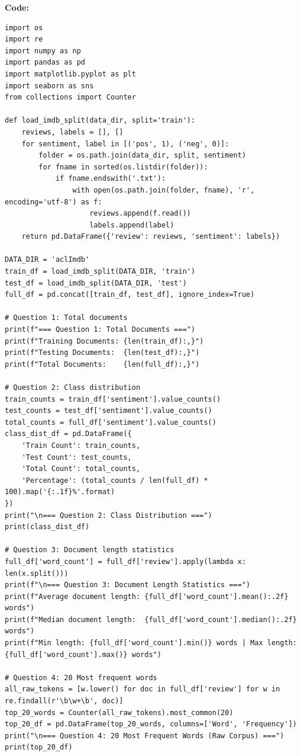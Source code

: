 \documentclass[12pt]{article}
\begin{document}
\textbf{Code:}

\begin{lstlisting}[style=code]
import os
import re
import numpy as np
import pandas as pd
import matplotlib.pyplot as plt
import seaborn as sns
from collections import Counter

def load_imdb_split(data_dir, split='train'):
    reviews, labels = [], []
    for sentiment, label in [('pos', 1), ('neg', 0)]:
        folder = os.path.join(data_dir, split, sentiment)
        for fname in sorted(os.listdir(folder)):
            if fname.endswith('.txt'):
                with open(os.path.join(folder, fname), 'r', encoding='utf-8') as f:
                    reviews.append(f.read())
                    labels.append(label)
    return pd.DataFrame({'review': reviews, 'sentiment': labels})

DATA_DIR = 'aclImdb'
train_df = load_imdb_split(DATA_DIR, 'train')
test_df = load_imdb_split(DATA_DIR, 'test')
full_df = pd.concat([train_df, test_df], ignore_index=True)

# Question 1: Total documents
print(f"=== Question 1: Total Documents ===")
print(f"Training Documents: {len(train_df):,}")
print(f"Testing Documents:  {len(test_df):,}")
print(f"Total Documents:    {len(full_df):,}")

# Question 2: Class distribution
train_counts = train_df['sentiment'].value_counts()
test_counts = test_df['sentiment'].value_counts()
total_counts = full_df['sentiment'].value_counts()
class_dist_df = pd.DataFrame({
    'Train Count': train_counts,
    'Test Count': test_counts,
    'Total Count': total_counts,
    'Percentage': (total_counts / len(full_df) * 100).map('{:.1f}%'.format)
})
print("\n=== Question 2: Class Distribution ===")
print(class_dist_df)

# Question 3: Document length statistics
full_df['word_count'] = full_df['review'].apply(lambda x: len(x.split()))
print(f"\n=== Question 3: Document Length Statistics ===")
print(f"Average document length: {full_df['word_count'].mean():.2f} words")
print(f"Median document length:  {full_df['word_count'].median():.2f} words")
print(f"Min length: {full_df['word_count'].min()} words | Max length: {full_df['word_count'].max()} words")

# Question 4: 20 Most frequent words
all_raw_tokens = [w.lower() for doc in full_df['review'] for w in re.findall(r'\b\w+\b', doc)]
top_20_words = Counter(all_raw_tokens).most_common(20)
top_20_df = pd.DataFrame(top_20_words, columns=['Word', 'Frequency'])
print("\n=== Question 4: 20 Most Frequent Words (Raw Corpus) ===")
print(top_20_df)
\end{lstlisting}
\end{document}
